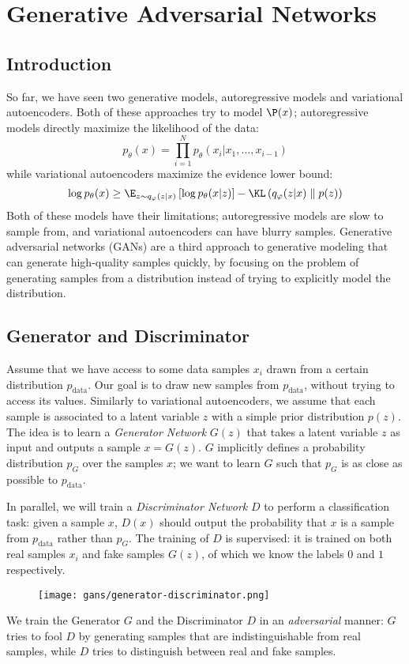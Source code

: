 \section{Generative Adversarial Networks}
\subsection{Introduction}
So far, we have seen two generative models, autoregressive models and variational autoencoders. Both of these approaches try to model $\P(x)$; autoregressive models directly maximize the likelihood of the data:
\begin{equation*}
    p_\theta(x) = \prod_{i=1}^N p_\theta(x_i|x_1, \dots, x_{i-1})
\end{equation*}
while variational autoencoders maximize the evidence lower bound:
\begin{equation*}
    \log p_\theta(x) \geq \E_{z\sim q_\varphi(z|x)}\left[\log p_\theta(x|z)\right] - \KL\left(q_\varphi(z|x)\;\middle\|\; p(z)\right)
\end{equation*}
Both of these models have their limitations; autoregressive models are slow to sample from, and variational autoencoders can have blurry samples. Generative adversarial networks (GANs) are a third approach to generative modeling that can generate high-quality samples quickly, by focusing on the problem of generating samples from a distribution instead of trying to explicitly model the distribution.

\subsection{Generator and Discriminator}
Assume that we have access to some data samples $x_i$ drawn from a certain distribution $p_{\text{data}}$. Our goal is to draw new samples from $p_{\text{data}}$, without trying to access its values. Similarly to variational autoencoders, we assume that each sample is associated to a latent variable $z$ with a simple prior distribution $p(z)$. The idea is to learn a \emph{Generator Network} $G(z)$ that takes a latent variable $z$ as input and outputs a sample $x = G(z)$. $G$ implicitly defines a probability distribution $p_G$ over the samples $x$; we want to learn $G$ such that $p_G$ is as close as possible to $p_{\text{data}}$.

In parallel, we will train a \emph{Discriminator Network} $D$ to perform a classification task: given a sample $x$, $D(x)$ should output the probability that $x$ is a sample from $p_{\text{data}}$ rather than $p_G$. The training of $D$ is supervised: it is trained on both real samples $x_i$ and fake samples $G(z)$, of which we know the labels $0$ and $1$ respectively.
\begin{figure}[H]
    \centering
    \texttt{[image: gans/generator-discriminator.png]}
\end{figure}
We train the Generator $G$ and the Discriminator $D$ in an \emph{adversarial} manner: $G$ tries to fool $D$ by generating samples that are indistinguishable from real samples, while $D$ tries to distinguish between real and fake samples.

